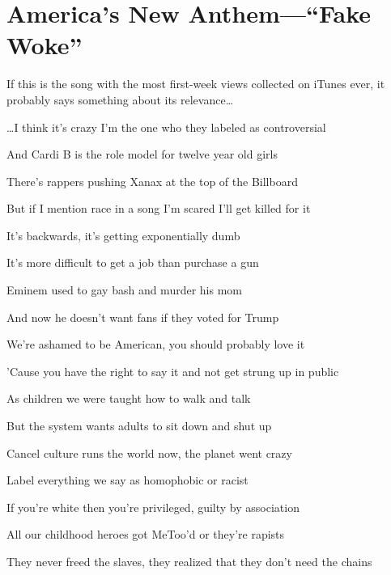 \chapter{America's New Anthem---\enquote{Fake Woke}}

\begin{refsection}

If this is the song with the most first-week views collected on iTunes ever, it probably says something about its relevance\dots{}


\begin{tcolorbox}[quote]

\dots{}I think it's crazy I'm the one who they labeled as controversial

And Cardi B is the role model for twelve year old girls

There's rappers pushing Xanax at the top of the Billboard

But if I mention race in a song I'm scared I'll get killed for it

It's backwards, it's getting exponentially dumb

It's more difficult to get a job than purchase a gun

Eminem used to gay bash and murder his mom

And now he doesn't want fans if they voted for Trump

We're ashamed to be American, you should probably love it

'Cause you have the right to say it and not get strung up in public


As children we were taught how to walk and talk

But the system wants adults to sit down and shut up

Cancel culture runs the world now, the planet went crazy

Label everything we say as homophobic or racist

If you're white then you're privileged, guilty by association

All our childhood heroes got MeToo'd or they're rapists

They never freed the slaves, they realized that they don't need the chains


\end{tcolorbox}
\end{refsection}

